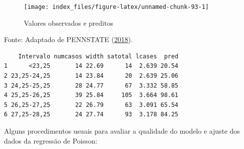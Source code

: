 \documentclass[12pt,brazil,oneside]{book}
\newenvironment{Shaded}{\begin{snugshade}}{\end{snugshade}}
\newcommand{\DataTypeTok}[1]{\textcolor[rgb]{0.13,0.29,0.53}{#1}}
\newcommand{\DecValTok}[1]{\textcolor[rgb]{0.00,0.00,0.81}{#1}}
\newcommand{\KeywordTok}[1]{\textcolor[rgb]{0.13,0.29,0.53}{\textbf{#1}}}
\newcommand{\NormalTok}[1]{#1}
\newcommand{\OperatorTok}[1]{\textcolor[rgb]{0.81,0.36,0.00}{\textbf{#1}}}
\newcommand{\StringTok}[1]{\textcolor[rgb]{0.31,0.60,0.02}{#1}}
\begin{document}
\begin{Shaded}
\end{Shaded}

\begin{figure}[H]

{\centering \texttt{[image: index\_files/figure-latex/unnamed-chunk-93-1]} 

}

\caption{Valores observados e preditos}\label{fig:unnamed-chunk-93}
\end{figure}

Fonte: Adaptado de PENNSTATE (\protect\hyperlink{ref-penn2018}{2018}).

\begin{Shaded}
\end{Shaded}

\begin{verbatim}
    Intervalo numcasos width satotal lcases  pred
1      <23,25       14 22.69      14  2.639 20.54
2 23,25-24,25       14 23.84      20  2.639 25.06
3 24,25-25,25       28 24.77      67  3.332 58.85
4 25,25-26,25       39 25.84     105  3.664 98.61
5 26,25-27,25       22 26.79      63  3.091 65.54
6 27,25-28,25       24 27.74      93  3.178 84.25
\end{verbatim}

Alguns procedimentos usuais para avaliar a qualidade do modelo e ajuste
dos dados da regressão de Poisson:
\end{document}
